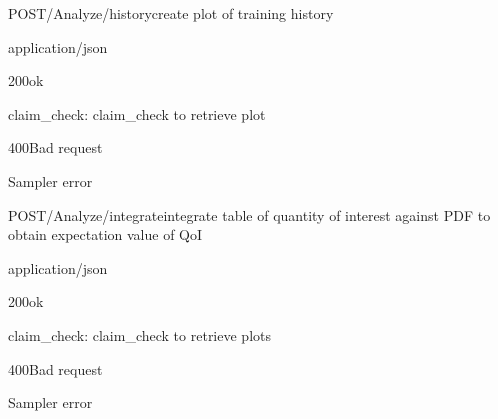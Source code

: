 \documentclass[12pt, etter]{article}
\begin{document}
\begin{apiRoute}{POST}{/Analyze/history}{create plot of training history}
    \begin{routeParameter}
    \end{routeParameter}
    \begin{routeResponse}{application/json}
        \begin{routeResponseItem}{200}{ok}
            \begin{routeResponseItemBody}
                claim_check: claim_check to retrieve plot
            \end{routeResponseItemBody}
        \end{routeResponseItem}
        \begin{routeResponseItem}{400}{Bad request}
            \begin{routeResponseItemBody}
                Sampler error
            \end{routeResponseItemBody}
        \end{routeResponseItem}
    \end{routeResponse}
\end{apiRoute}

\begin{apiRoute}{POST}{/Analyze/integrate}{integrate table of quantity of interest against PDF to obtain expectation value of QoI}
    \begin{routeParameter}
    \end{routeParameter}
    \begin{routeResponse}{application/json}
        \begin{routeResponseItem}{200}{ok}
            \begin{routeResponseItemBody}
                claim_check: claim_check to retrieve plots
            \end{routeResponseItemBody}
        \end{routeResponseItem}
        \begin{routeResponseItem}{400}{Bad request}
            \begin{routeResponseItemBody}
                Sampler error
            \end{routeResponseItemBody}
        \end{routeResponseItem}
    \end{routeResponse}
\end{apiRoute}
\end{document}
